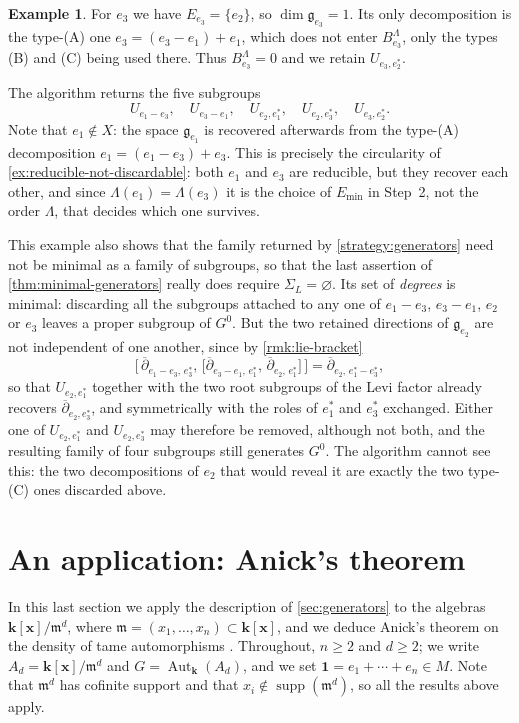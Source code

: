 \documentclass[11pt,letterpaper,reqno]{amsart}
\theoremstyle{remark}
\theoremstyle{definition}
\newtheorem{example}[example]{Example}
\def\M{\mathfrak{m}}
\def\XX{\mathbf{x}}
\newcommand{\KK}[0]{\ensuremath{\mathbf{k}}}
\newcommand{\supp}[0]{\ensuremath{\operatorname{supp}}}
\newcommand{\Aut}[0]{\ensuremath{\operatorname{Aut}}}
\begin{document}
\begin{example}
For $e_3$ we have $E_{e_3}=\{e_2\}$, so $\dim\mathfrak g_{e_3}=1$. Its only decomposition is
the type-\textup{(A)} one $e_3=(e_3-e_1)+e_1$, which does not enter $B^\Lambda_{e_3}$, only
the types \textup{(B)} and \textup{(C)} being used there. Thus $B^{\Lambda}_{e_3}=0$ and we
retain $U_{e_3,e_2^*}$.

The algorithm returns the five subgroups
$$U_{e_1-e_3},\quad U_{e_3-e_1},\quad U_{e_2,e_1^*},\quad U_{e_2,e_3^*},\quad U_{e_3,e_2^*}.$$
Note that $e_1\notin X$: the space $\mathfrak g_{e_1}$ is recovered afterwards from the
type-\textup{(A)} decomposition $e_1=(e_1-e_3)+e_3$. This is precisely the circularity of
\cref{ex:reducible-not-discardable}: both $e_1$ and $e_3$ are reducible, but they recover each
other, and since $\Lambda(e_1)=\Lambda(e_3)$ it is the choice of $E_{\mathrm{min}}$ in Step~2,
not the order $\Lambda$, that decides which one survives.

This example also shows that the family returned by \cref{strategy:generators} need
not be minimal as a family of subgroups, so that the last assertion of
\cref{thm:minimal-generators} really does require $\Sigma_L=\varnothing$. Its set of
\emph{degrees} is minimal: discarding all the subgroups attached to any one of $e_1-e_3$,
$e_3-e_1$, $e_2$ or $e_3$ leaves a proper subgroup of $G^0$. But the two retained directions
of $\mathfrak g_{e_2}$ are not independent of one another, since by \cref{rmk:lie-bracket}
$$\bigl[\,\overline\partial_{e_1-e_3,\,e_3^*},\,
\bigl[\overline\partial_{e_3-e_1,\,e_1^*},\,\overline\partial_{e_2,\,e_1^*}\bigr]\,\bigr]
=\overline\partial_{e_2,\,e_1^*-e_3^*},$$
so that $U_{e_2,e_1^*}$ together with the two root subgroups of the Levi factor already
recovers $\overline\partial_{e_2,e_3^*}$, and symmetrically with the roles of $e_1^*$ and
$e_3^*$ exchanged. Either one of $U_{e_2,e_1^*}$ and $U_{e_2,e_3^*}$ may therefore be removed, although not both, and the resulting family of four subgroups still generates $G^0$.
The algorithm cannot see this: the two decompositions of $e_2$ that would reveal it are
exactly the two type-\textup{(C)} ones discarded above.
\end{example}


\section{An application: Anick's theorem}\label{sec:anick}

In this last section we apply the description of \cref{sec:generators} to the algebras
$\KK[\XX]/\M^d$, where $\M=(x_1,\dots,x_n)\subset\KK[\XX]$, and we deduce Anick's theorem
on the density of tame automorphisms \cite{Anick83}. Throughout, $n\geq2$ and $d\geq2$; we
write $A_d=\KK[\XX]/\M^d$ and $G=\Aut_\KK(A_d)$, and we set
$\mathbf 1=e_1+\cdots+e_n\in M$. Note that $\M^d$ has cofinite support and that
$x_i\notin\supp(\M^d)$, so all the results above apply.
\end{document}
